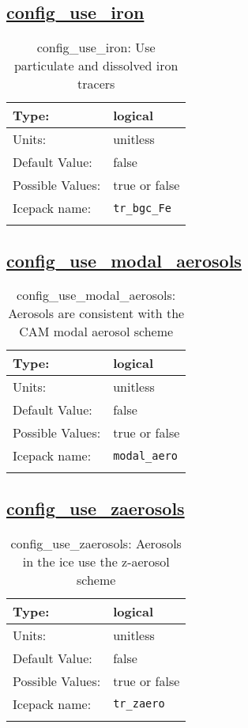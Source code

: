\subsection[config\_use\_iron]{\hyperref[sec:nm_tab_biogeochemistry]{config\_use\_iron}}
\label{subsec:nm_sec_config_use_iron}
\begin{center}
\begin{longtable}{| p{2.0in} || p{4.0in} |}
    \hline
    Type: & logical \\
    \hline
    Units: & \si{unitless} \\
    \hline
    Default Value: & false \\
    \hline
    Possible Values: & true or false \\
    \hline
    \hline
    Icepack name: & \verb+tr_bgc_Fe+ \\
    \caption{config\_use\_iron: Use particulate and dissolved iron tracers}
\end{longtable}
\end{center}
\subsection[config\_use\_modal\_aerosols]{\hyperref[sec:nm_tab_biogeochemistry]{config\_use\_modal\_aerosols}}
\label{subsec:nm_sec_config_use_modal_aerosols}
\begin{center}
\begin{longtable}{| p{2.0in} || p{4.0in} |}
    \hline
    Type: & logical \\
    \hline
    Units: & \si{unitless} \\
    \hline
    Default Value: & false \\
    \hline
    Possible Values: & true or false \\
    \hline
    \hline
    Icepack name: & \verb+modal_aero+ \\
    \caption{config\_use\_modal\_aerosols: Aerosols are consistent with the CAM modal aerosol scheme}
\end{longtable}
\end{center}
\subsection[config\_use\_zaerosols]{\hyperref[sec:nm_tab_biogeochemistry]{config\_use\_zaerosols}}
\label{subsec:nm_sec_config_use_zaerosols}
\begin{center}
\begin{longtable}{| p{2.0in} || p{4.0in} |}
    \hline
    Type: & logical \\
    \hline
    Units: & \si{unitless} \\
    \hline
    Default Value: & false \\
    \hline
    Possible Values: & true or false \\
    \hline
    \hline
    Icepack name: & \verb+tr_zaero+ \\
    \caption{config\_use\_zaerosols: Aerosols in the ice use the z-aerosol scheme}
\end{longtable}
\end{center}
